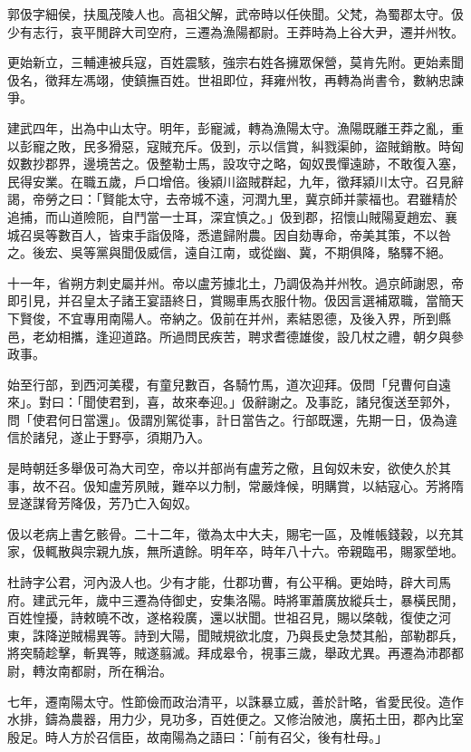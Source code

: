 
\begin{pinyinscope}
郭伋字細侯，扶風茂陵人也。高祖父解，武帝時以任俠聞。父梵，為蜀郡太守。伋少有志行，哀平閒辟大司空府，三遷為漁陽都尉。王莽時為上谷大尹，遷并州牧。

更始新立，三輔連被兵寇，百姓震駭，強宗右姓各擁眾保營，莫肯先附。更始素聞伋名，徵拜左馮翊，使鎮撫百姓。世祖即位，拜雍州牧，再轉為尚書令，數納忠諫爭。

建武四年，出為中山太守。明年，彭寵滅，轉為漁陽太守。漁陽既離王莽之亂，重以彭寵之敗，民多猾惡，寇賊充斥。伋到，示以信賞，糾戮渠帥，盜賊銷散。時匈奴數抄郡界，邊境苦之。伋整勒士馬，設攻守之略，匈奴畏憚遠跡，不敢復入塞，民得安業。在職五歲，戶口增倍。後潁川盜賊群起，九年，徵拜潁川太守。召見辭謁，帝勞之曰：「賢能太守，去帝城不遠，河潤九里，冀京師并蒙福也。君雖精於追捕，而山道險阨，自鬥當一士耳，深宜慎之。」伋到郡，招懷山賊陽夏趙宏、襄城召吳等數百人，皆束手詣伋降，悉遣歸附農。因自劾專命，帝美其策，不以咎之。後宏、吳等黨與聞伋威信，遠自江南，或從幽、冀，不期俱降，駱驛不絕。

十一年，省朔方刺史屬并州。帝以盧芳據北土，乃調伋為并州牧。過京師謝恩，帝即引見，并召皇太子諸王宴語終日，賞賜車馬衣服什物。伋因言選補眾職，當簡天下賢俊，不宜專用南陽人。帝納之。伋前在并州，素結恩德，及後入界，所到縣邑，老幼相攜，逢迎道路。所過問民疾苦，聘求耆德雄俊，設几杖之禮，朝夕與參政事。

始至行部，到西河美稷，有童兒數百，各騎竹馬，道次迎拜。伋問「兒曹何自遠來」。對曰：「聞使君到，喜，故來奉迎。」伋辭謝之。及事訖，諸兒復送至郭外，問「使君何日當還」。伋謂別駕從事，計日當告之。行部既還，先期一日，伋為違信於諸兒，遂止于野亭，須期乃入。

是時朝廷多舉伋可為大司空，帝以并部尚有盧芳之儆，且匈奴未安，欲使久於其事，故不召。伋知盧芳夙賊，難卒以力制，常嚴烽候，明購賞，以結寇心。芳將隋昱遂謀脅芳降伋，芳乃亡入匈奴。

伋以老病上書乞骸骨。二十二年，徵為太中大夫，賜宅一區，及帷帳錢穀，以充其家，伋輒散與宗親九族，無所遺餘。明年卒，時年八十六。帝親臨弔，賜冢塋地。

杜詩字公君，河內汲人也。少有才能，仕郡功曹，有公平稱。更始時，辟大司馬府。建武元年，歲中三遷為侍御史，安集洛陽。時將軍蕭廣放縱兵士，暴橫民閒，百姓惶擾，詩敕曉不改，遂格殺廣，還以狀聞。世祖召見，賜以棨戟，復使之河東，誅降逆賊楊異等。詩到大陽，聞賊規欲北度，乃與長史急焚其船，部勒郡兵，將突騎趁擊，斬異等，賊遂翦滅。拜成皋令，視事三歲，舉政尤異。再遷為沛郡都尉，轉汝南都尉，所在稱治。

七年，遷南陽太守。性節儉而政治清平，以誅暴立威，善於計略，省愛民役。造作水排，鑄為農器，用力少，見功多，百姓便之。又修治陂池，廣拓土田，郡內比室殷足。時人方於召信臣，故南陽為之語曰：「前有召父，後有杜母。」


\end{pinyinscope}
